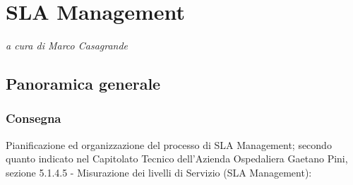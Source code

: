 
\chapter{SLA Management}
\begin{flushright}
\textit{a cura di \large{Marco Casagrande}}
\end{flushright}
\label{cap:slamanagement}

\section{Panoramica generale}

\subsection{Consegna}

Pianificazione ed organizzazione del processo di SLA Management; secondo quanto indicato nel Capitolato Tecnico dell'Azienda Ospedaliera Gaetano Pini, sezione 5.1.4.5 - Misurazione dei livelli di Servizio (SLA Management):
\\

